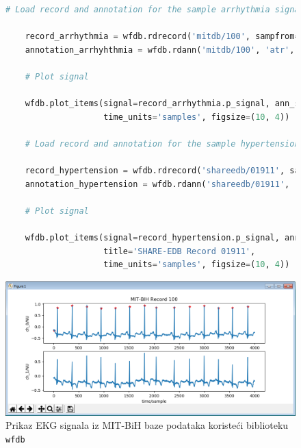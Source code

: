 \documentclass[12pt,a4paper]{article}
\begin{document}
\begin{figure}
\label{wfdb-plot}
\begin{lstlisting}[language=python]
    # Load record and annotation for the sample arrhythmia signal

    record_arrhythmia = wfdb.rdrecord('mitdb/100', sampfrom=0, sampto=4000)
    annotation_arrhyhthmia = wfdb.rdann('mitdb/100', 'atr', sampfrom=0, sampto=4000)

    # Plot signal

    wfdb.plot_items(signal=record_arrhythmia.p_signal, ann_samp=[annotation_arrhyhthmia.sample], title='MIT-BIH Record 100',
                    time_units='samples', figsize=(10, 4))

    # Load record and annotation for the sample hypertension signal

    record_hypertension = wfdb.rdrecord('shareedb/01911', sampfrom=0, sampto=104000)
    annotation_hypertension = wfdb.rdann('shareedb/01911', 'qrs', sampfrom=0, sampto=104000)

    # Plot signal

    wfdb.plot_items(signal=record_hypertension.p_signal, ann_samp=[annotation_hypertension.sample],
                    title='SHARE-EDB Record 01911',
                    time_units='samples', figsize=(10, 4))
\end{lstlisting}
\end{figure}

\begin{figure}[H]
\center
\includegraphics[scale=0.55]{../res/plot-mit.PNG}
\caption{Prikaz EKG signala iz MIT-BiH baze podataka koristeći biblioteku \texttt{wfdb}}
\label{plot-arrhythmia}
\end{figure}
\end{document}
